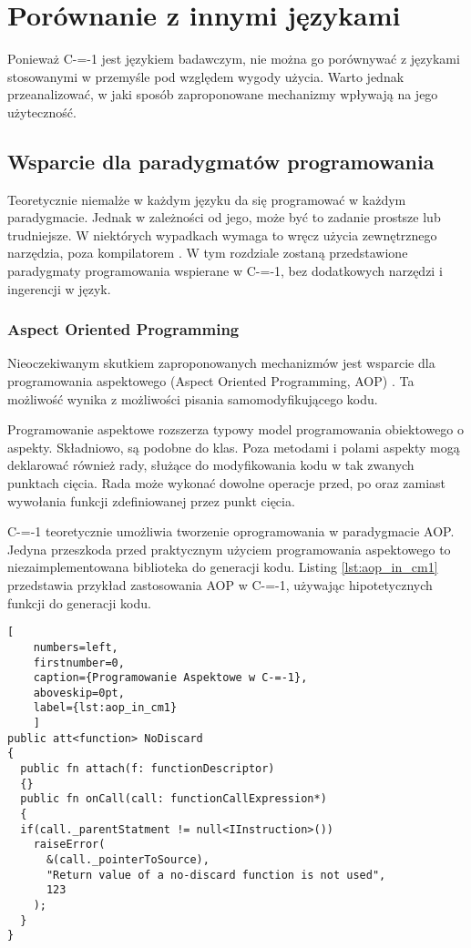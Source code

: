 \section{Porównanie z innymi językami}
Ponieważ C-=-1 jest językiem badawczym, nie można go porównywać z językami stosowanymi w przemyśle pod względem wygody użycia.
Warto jednak przeanalizować, w jaki sposób zaproponowane mechanizmy wpływają na jego użyteczność.

\subsection{Wsparcie dla paradygmatów programowania}
Teoretycznie niemalże w każdym języku da się programować w każdym paradygmacie. Jednak w zależności od jego, może być to zadanie prostsze lub trudniejsze.
W niektórych wypadkach wymaga to wręcz użycia zewnętrznego narzędzia, poza kompilatorem \cite{aop:cpp}.
W tym rozdziale zostaną przedstawione paradygmaty programowania wspierane w C-=-1, bez dodatkowych narzędzi i ingerencji w język.

\subsubsection{Aspect Oriented Programming}
Nieoczekiwanym skutkiem zaproponowanych mechanizmów jest wsparcie dla programowania aspektowego (Aspect Oriented Programming, AOP) \cite{aop}.
Ta możliwość wynika z możliwości pisania samomodyfikującego kodu.

Programowanie aspektowe rozszerza typowy model programowania obiektowego o aspekty.
Składniowo, są podobne do klas.
Poza metodami i polami aspekty mogą deklarować również rady, służące do modyfikowania kodu w tak zwanych punktach cięcia.
Rada może wykonać dowolne operacje przed, po oraz zamiast wywołania funkcji zdefiniowanej przez punkt cięcia.

C-=-1 teoretycznie umożliwia tworzenie oprogramowania w paradygmacie AOP.
Jedyna przeszkoda przed praktycznym użyciem programowania aspektowego to niezaimplementowana biblioteka do generacji kodu.
Listing \ref{lst:aop_in_cm1} przedstawia przykład zastosowania AOP w C-=-1, używając hipotetycznych funkcji do generacji kodu.

\begin{minipage}{\linewidth}
  
  \begin{lstlisting}[
    numbers=left,
    firstnumber=0,
    caption={Programowanie Aspektowe w C-=-1},
    aboveskip=0pt,
    label={lst:aop_in_cm1}
    ]
public att<function> NoDiscard
{
  public fn attach(f: functionDescriptor)
  {}
  public fn onCall(call: functionCallExpression*)
  {
  if(call._parentStatment != null<IInstruction>())
    raiseError(
      &(call._pointerToSource), 
      "Return value of a no-discard function is not used",
      123
    );
  }
}
\end{lstlisting}
\end{minipage}

